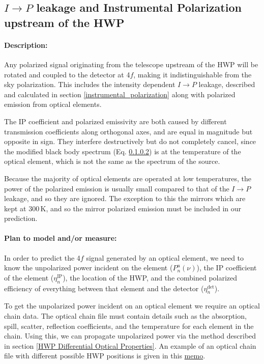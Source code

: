 
\subsection{$I\rightarrow P$ leakage and Instrumental Polarization upstream of the HWP}
\label{IP upstream of HWP}

\paragraph{Description:}
Any polarized signal originating from the telescope upstream of the HWP will be rotated and coupled to the detector at 4$f$,
making it indistinguishable from the sky polarization.
This includes the intensity dependent $I\rightarrow P$ leakage, 
described and calculated in section \ref{instrumental_polarization} 
along with polarized emission from optical elements. 

The IP coefficient and polarized emissivity are both caused by different transmission coefficients along orthogonal axes,
and are equal in magnitude but opposite in sign.
They interfere destructively but do not completely cancel, since the modified black body spectrum (Eq. \ref{}) is at the temperature
of the optical element, which is not the same as the spectrum of the source.

Because the majority of optical elements are operated at low temperatures, 
the power of the polarized emission is usually small compared to that of the $I\rightarrow P$ leakage, and so they are ignored.
The exception to this the mirrors which are kept at 300\,K, and so the mirror polarized emission must be included in our prediction.

\paragraph{Plan to model and/or measure:}
In order to predict the 4$f$ signal generated by an optical element, 
we need to know the unpolarized power incident on the element ($P^u_n(\nu)$), the IP coefficient of the element 
($\eta_n^\text{IP}$), the location of the HWP,
and the combined polarized efficiency of everything between that element and the detector ($\eta_n^\text{det}$).

To get the unpolarized power incident on an optical element we require an optical chain data.
The optical chain file must contain details such as the absorption, spill, scatter, reflection coefficients, and 
the temperature for each element in the chain.
Using this, we can propagate unpolarized power via the method described in section \ref{HWP Differential Optical Properties}. 
An example of an optical chain file with different possible HWP positions is given in this 
\href{http://simonsobservatory.wdfiles.com/local--files/calandsys-telecon/eb_leakage_from_pointing_error.pdf?ukey=61f26ef33e8439a4e7096ab52c54c523066a4e35}{memo}.

